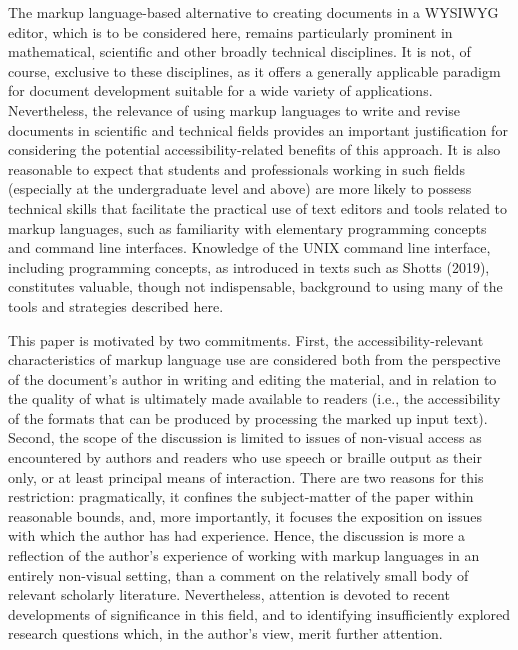 \documentclass[11pt]{sig-alternate}
\begin{document}
\begin{large}
The markup language-based alternative to creating documents in a WYSIWYG editor, which is to be considered here, remains particularly prominent in mathematical, scientific and other broadly technical disciplines. It is not, of course, exclusive to these disciplines, as it offers a generally applicable paradigm for document development suitable for a wide variety of applications. Nevertheless, the relevance of using mark\-up languages to write and revise documents in scientific and technical fields provides an important justification for considering the potential accessibility-related benefits of this approach. It is also reasonable to expect that students and professionals working in such fields (especially at the undergraduate level and above) are more likely to possess technical skills that facilitate the practical use of text editors and tools related to markup languages, such as familiarity with elementary programming concepts and command line interfaces. Knowledge of the UNIX command line interface, including programming concepts, as introduced in texts such as Shotts (2019), constitutes valuable, though not indispensable, background to using many of the tools and strategies described here.

This paper is motivated by two commitments. First, the accessibility-relevant characteristics of markup language use are considered both from the perspective of the document’s author in writing and editing the material, and in relation to the quality of what is ultimately made available to readers (i.e., the accessibility of the formats that can be produced by processing the marked up input text). Second, the scope of the discussion is limited to issues of non-visual access as encountered by authors and readers who use speech or braille output as their only, or at least principal means of interaction. There are two reasons for this restriction: pragmatically, it confines the subject-matter of the paper within reasonable bounds, and, more importantly, it focuses the exposition on issues with which the author has had experience. Hence, the discussion is more a reflection of the author’s experience of working with markup languages in an entirely non-visual setting, than a comment on the relatively small body of relevant scholarly literature. Nevertheless, attention is devoted to recent developments of significance in this field, and to identifying insufficiently explored research questions which, in the author’s view, merit further attention. 


\end{large}
\end{document}
